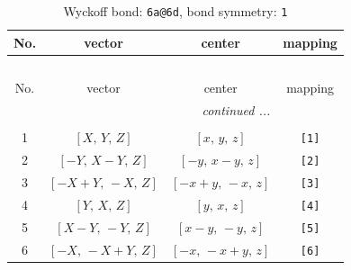 \documentclass[fleqn,8pt]{jsarticle}
\begin{document}
\begin{longtable}{cccc}
\caption{Wyckoff bond: {\tt 6a@6d}, bond symmetry: {\tt 1}}
 \\
 \hline \hline
No. & vector & center & mapping \\ \hline \endfirsthead

\multicolumn{3}{l}{\tablename\ \thetable{}} \\
 \hline \hline
No. & vector & center & mapping \\ \hline \endhead

 \hline \hline
\multicolumn{3}{r}{\footnotesize\it continued ...} \\ \endfoot

 \hline \hline
\multicolumn{3}{r}{} \\ \endlastfoot

1 & $\left[ X,\, Y,\, Z \right]$ & $\left[ x,\, y,\, z \right]$ & {\tt [1]} \\ \hline
2 & $\left[ - Y,\, X - Y,\, Z \right]$ & $\left[ - y,\, x - y,\, z \right]$ & {\tt [2]} \\ \hline
3 & $\left[ - X + Y,\, - X,\, Z \right]$ & $\left[ - x + y,\, - x,\, z \right]$ & {\tt [3]} \\ \hline
4 & $\left[ Y,\, X,\, Z \right]$ & $\left[ y,\, x,\, z \right]$ & {\tt [4]} \\ \hline
5 & $\left[ X - Y,\, - Y,\, Z \right]$ & $\left[ x - y,\, - y,\, z \right]$ & {\tt [5]} \\ \hline
6 & $\left[ - X,\, - X + Y,\, Z \right]$ & $\left[ - x,\, - x + y,\, z \right]$ & {\tt [6]} \\
\end{longtable}
\end{document}
